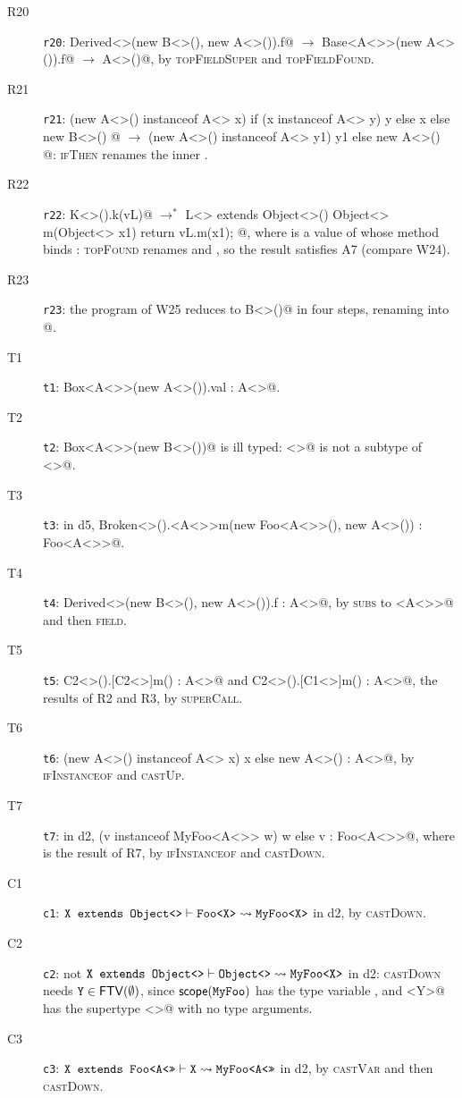 \begin{description}
\item[R20] \texttt{r20}: \Q@new Derived<>(new B<>(), new A<>()).f@ $\rightarrow$ \Q@new Base<A<>>(new A<>()).f@ $\rightarrow$ \Q@new A<>()@, by \textsc{topFieldSuper} and \textsc{topFieldFound}.
\item[R21] \texttt{r21}: \Q@if (new A<>() instanceof A<> x){ if (x instanceof A<> y){ y } else { x } } else { new B<>() }@ $\rightarrow$ \Q@if (new A<>() instanceof A<> y1){ y1 } else { new A<>() }@: \textsc{ifThen} renames the inner \Q@y@.
\item[R22] \texttt{r22}: \Q@new K<>().k(vL)@ $\rightarrow^*$ \Q@new L<> extends Object<>(){ Object<> m(Object<> x1){ return vL.m(x1); } }@, where \Q@vL@ is a value of \Q@L@ whose method \Q@m@ binds \Q@x@: \textsc{topFound} renames \Q@y@ and \Q@x@, so the result satisfies A7 (compare W24).
\item[R23] \texttt{r23}: the program of W25 reduces to \Q@new B<>()@ in four steps, renaming \Q@y@ into @.
\item[T1] \texttt{t1}: \Q@new Box<A<>>(new A<>()).val : A<>@.
\item[T2] \texttt{t2}: \Q@new Box<A<>>(new B<>())@ is ill typed: \Q@B<>@ is not a subtype of \Q@A<>@.
\item[T3] \texttt{t3}: in d5, \Q@new Broken<>().<A<>>m(new Foo<A<>>(), new A<>()) : Foo<A<>>@.
\item[T4] \texttt{t4}: \Q@new Derived<>(new B<>(), new A<>()).f : A<>@, by \textsc{subs} to \Q@Base<A<>>@ and then \textsc{field}.
\item[T5] \texttt{t5}: \Q@new C2<>().[C2<>]m() : A<>@ and \Q@new C2<>().[C1<>]m() : A<>@, the results of R2 and R3, by \textsc{superCall}.
\item[T6] \texttt{t6}: \Q@if (new A<>() instanceof A<> x){ x } else { new A<>() } : A<>@, by \textsc{ifInstanceof} and \textsc{castUp}.
\item[T7] \texttt{t7}: in d2, \Q@if (v instanceof MyFoo<A<>> w){ w } else { v } : Foo<A<>>@, where \Q@v@ is the result of R7, by \textsc{ifInstanceof} and \textsc{castDown}.
\item[C1] \texttt{c1}: $\text{\ttfamily X extends Object<>}\vdash \text{\ttfamily Foo<X>} \rightsquigarrow \text{\ttfamily MyFoo<X>}$ in d2, by \textsc{castDown}.
\item[C2] \texttt{c2}: not $\text{\ttfamily X extends Object<>}\vdash \text{\ttfamily Object<>} \rightsquigarrow \text{\ttfamily MyFoo<X>}$ in d2: \textsc{castDown} needs $\text{\ttfamily Y}\in\mathsf{FTV}(\emptyset)$, since $\mathsf{scope}(\text{\ttfamily MyFoo})$ has the type variable \Q@Y@, and \Q@MyFoo<Y>@ has the supertype \Q@Object<>@ with no type arguments.
\item[C3] \texttt{c3}: $\text{\ttfamily X extends Foo<A<>>}\vdash \text{\ttfamily X} \rightsquigarrow \text{\ttfamily MyFoo<A<>>}$ in d2, by \textsc{castVar} and then \textsc{castDown}.

\end{description}
